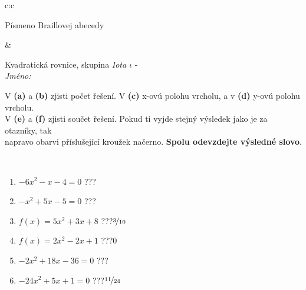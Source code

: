 \documentclass[10pt]{report}
\begin{document}
\begin{tabular}{c:c}
\begin{minipage}[c][104.5mm][t]{0.5\linewidth}
\begin{center}
\begin{minipage}{0.20\linewidth}
\begin{center}
{\small Písmeno Braillovej abecedy}
\end{center}
\end{minipage}
\end{center}
\end{minipage}
&
\begin{minipage}[c][104.5mm][t]{0.5\linewidth}
\begin{center}
\vspace{7mm}
{\huge Kvadratická rovnice, skupina \textit{Iota $\iota$} -}\\[5mm]
\textit{Jméno:}\phantom{xxxxxxxxxxxxxxxxxxxxxxxxxxxxxxxxxxxxxxxxxxxxxxxxxxxxxxxxxxxxxxxxx}\\[5mm]
\begin{minipage}{0.95\linewidth}
\begin{center}
V \textbf{(a)} a \textbf{(b)} zjisti počet řešení. V \textbf{(c)} x-ovú polohu vrcholu, a v \textbf{(d)} y-ovú polohu vrcholu.\\V \textbf{(e)} a \textbf{(f)} zjisti součet řešení. Pokud ti vyjde stejný výsledek jako je za otazníky, tak\\napravo obarvi příslušející kroužek načerno. \textbf{Spolu odevzdejte výsledné slovo}.
\end{center}
\end{minipage}
\\[1mm]
\begin{minipage}{0.79\linewidth}
\begin{center}
\begin{varwidth}{\linewidth}
\begin{enumerate}
\Large
\item $-6x^2-x-4=0$\quad \dotfill\; ???\;\dotfill {}
\item $-x^2+5x-5=0$\quad \dotfill\; ???\;\dotfill {}
\item $f(x)=5x^2+3x+8$\quad \dotfill\; ???\;\dotfill \quad $\nicefrac{3}{10}$
\item $f(x)=2x^2-2x+1$\quad \dotfill\; ???\;\dotfill \quad $0$
\item $-2x^2+18x-36=0$\quad \dotfill\; ???\;\dotfill {}
\item $-24x^2+5x+1=0$\quad \dotfill\; ???\;\dotfill \quad $\nicefrac{11}{24}$
\end{enumerate}
\end{varwidth}
\end{center}
\end{minipage}
\begin{minipage}{0.20\linewidth}
\begin{center}

\end{center}
\end{minipage}
\end{center}
\end{minipage}
\end{tabular}
\end{document}
